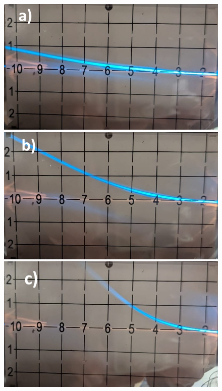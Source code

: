 \documentclass[11pt]{article}
\begin{document}
\begin{figure}[h]
    \centering
    \begin{minipage}{0.38\textwidth}
        \centering
        \includegraphics[width=\textwidth]{1kV.jpg}
    \end{minipage}
    \begin{minipage}{0.38\textwidth}
        \centering
        \includegraphics[width=\textwidth]{2kV.jpg}
    \end{minipage}
    \begin{minipage}{0.38\textwidth}
        \centering
        \includegraphics[width=\textwidth]{3kV.jpg}

\end{minipage}
\end{figure}
\end{document}
